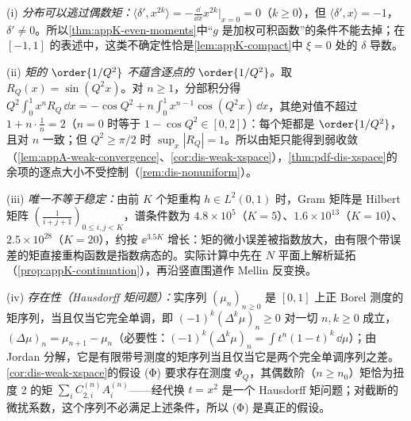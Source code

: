 \begin{remark}[反例与稳定性]\label{rem:appK-counterexamples}
(i) \emph{分布可以逃过偶数矩：}$\langle\delta',x^{2k}\rangle=-\frac{\dd}{\dd x}x^{2k}|_{x=0}=0$（$k\ge0$），但 $\langle\delta',x\rangle=-1$，$\delta'\ne0$。所以\cref{thm:appK-even-moments}中“$g$ 是加权可积函数”的条件不能去掉；在 $[-1,1]$ 的表述中，这类不确定性恰是\cref{lem:appK-compact}中 $\xi=0$ 处的 $\delta$ 导数。

(ii) \emph{矩的 $\order{1/Q^2}$ 不蕴含逐点的 $\order{1/Q^2}$。}取 $R_Q(x)=\sin(Q^2x)$。对 $n\ge1$，分部积分得 $Q^2\int_0^1x^nR_Q\,\dd x=-\cos Q^2+n\int_0^1x^{n-1}\cos(Q^2x)\,\dd x$，其绝对值不超过 $1+n\cdot\frac1n=2$（$n=0$ 时等于 $1-\cos Q^2\in[0,2]$）：每个矩都是 $\order{1/Q^2}$，且对 $n$ 一致；但 $Q^2\ge\pi/2$ 时 $\sup_x|R_Q|=1$。所以由矩只能得到弱收敛（\cref{lem:appA-weak-convergence}、\cref{cor:dis-weak-xspace}），\cref{thm:pdf-dis-xspace}的余项的逐点大小不受控制（\cref{rem:dis-nonuniform}）。

(iii) \emph{唯一不等于稳定：}由前 $K$ 个矩重构 $h\in L^2(0,1)$ 时，Gram 矩阵是 Hilbert 矩阵 $(\frac1{i+j+1})_{0\le i,j<K}$，谱条件数为 $4.8\times10^5$（$K=5$）、$1.6\times10^{13}$（$K=10$）、$2.5\times10^{28}$（$K=20$），约按 $\ee^{3.5K}$ 增长：矩的微小误差被指数放大，由有限个带误差的矩直接重构函数是指数病态的。实际计算中先在 $N$ 平面上解析延拓（\cref{prop:appK-continuation}），再沿竖直围道作 Mellin 反变换。

(iv) \emph{存在性（Hausdorff 矩问题）：}实序列 $(\mu_n)_{n\ge0}$ 是 $[0,1]$ 上正 Borel 测度的矩序列，当且仅当它完全单调，即 $(-1)^k(\Delta^k\mu)_n\ge0$ 对一切 $n,k\ge0$ 成立，$(\Delta\mu)_n=\mu_{n+1}-\mu_n$\cite{Hausdorff1921a,Hausdorff1921b}（必要性：$(-1)^k(\Delta^k\mu)_n=\int t^n(1-t)^k\,\dd\mu$）；由 Jordan 分解，它是有限带号测度的矩序列当且仅当它是两个完全单调序列之差。\cref{cor:dis-weak-xspace}的假设 (Φ) 要求存在测度 $\Phi_Q$，其偶数阶（$n\ge n_0$）矩恰为扭度 2 的矩 $\sum_iC^{(n)}_{2,i}A^{(n)}_i$——经代换 $t=x^2$ 是一个 Hausdorff 矩问题；对截断的微扰系数，这个序列不必满足上述条件，所以 (Φ) 是真正的假设。
\end{remark}
